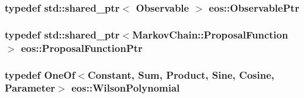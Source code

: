 \label{namespaceeos_a0ab446e6a801d96a1ee83bb7c070686f}
\hypertarget{namespaceeos_a470e5dd806bd129080f1aa0c2954646f}{
\subsubsection[{ObservablePtr}]{\setlength{\rightskip}{0pt plus 5cm}typedef std::shared\_\-ptr$<$ {\bf Observable} $>$ {\bf eos::ObservablePtr}}}
\label{namespaceeos_a470e5dd806bd129080f1aa0c2954646f}
\hypertarget{namespaceeos_ae97f9891c67c90959a03fc96efaa4dc9}{
\subsubsection[{ProposalFunctionPtr}]{\setlength{\rightskip}{0pt plus 5cm}typedef std::shared\_\-ptr$<${\bf MarkovChain::ProposalFunction}$>$ {\bf eos::ProposalFunctionPtr}}}
\label{namespaceeos_ae97f9891c67c90959a03fc96efaa4dc9}
\hypertarget{namespaceeos_ad0c57fa62d09f6465421603cb5285284}{
\subsubsection[{WilsonPolynomial}]{\setlength{\rightskip}{0pt plus 5cm}typedef {\bf OneOf}$<$Constant, Sum, Product, Sine, Cosine, {\bf Parameter}$>$ {\bf eos::WilsonPolynomial}}}
\label{namespaceeos_ad0c57fa62d09f6465421603cb5285284}


